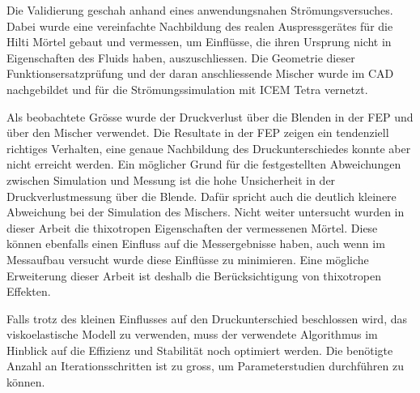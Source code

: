 Die Validierung geschah anhand eines anwendungsnahen Strömungsversuches. Dabei wurde eine vereinfachte Nachbildung des realen Auspressgerätes für die Hilti Mörtel gebaut und vermessen, um Einflüsse, die ihren Ursprung nicht in Eigenschaften des Fluids haben, auszuschliessen.
Die Geo\-me\-trie dieser Funktionsersatzprüfung und der daran anschliessende Mischer wurde im CAD nachgebildet und für die Strömungssimulation mit ICEM Tetra vernetzt.

Als beobachtete Grösse wurde der Druckverlust über die Blenden in der FEP und über den Mischer verwendet.
Die Resultate in der FEP zeigen ein tendenziell richtiges Verhalten, eine genaue Nachbildung des Druckunterschiedes konnte aber nicht erreicht werden. 
Ein möglicher Grund für die festgestellten Abweichungen zwischen Simulation und Messung ist die hohe Unsicherheit in der Druckverlustmessung über die Blende. Dafür spricht auch die deutlich kleinere Abweichung bei der Simulation des Mischers.
Nicht weiter untersucht wurden in dieser Arbeit die thixotropen Eigenschaften der vermessenen Mörtel. 
Diese können ebenfalls einen Einfluss auf die Messergebnisse haben, auch wenn im Messaufbau versucht wurde diese Einflüsse zu minimieren.
Eine mögliche Erweiterung dieser Arbeit ist deshalb die Berücksichtigung von thixotropen Effekten.

Falls trotz des kleinen Einflusses auf den Druckunterschied beschlossen wird, das viskoelastische Modell zu verwenden, muss der verwendete Algorithmus im Hinblick auf die Effizienz und Stabilität noch optimiert werden. Die benötigte Anzahl an Iterationsschritten ist zu gross, um Parameterstudien durchführen zu können.

